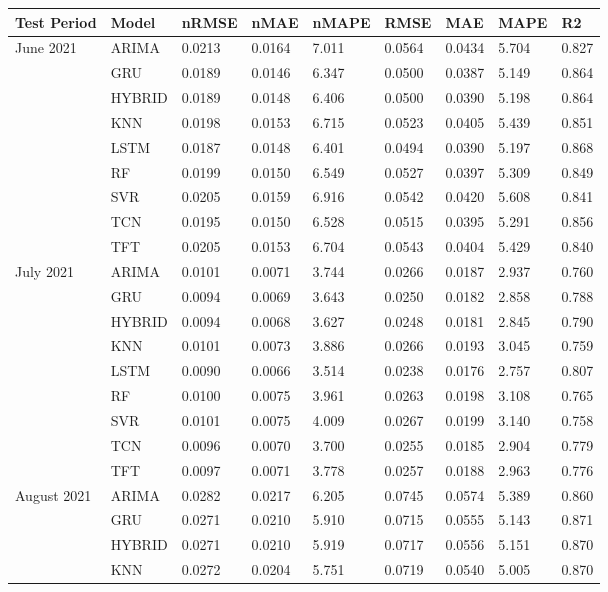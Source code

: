 \begin{tabular}{lllllllll}
\toprule
Test Period & Model & nRMSE & nMAE & nMAPE & RMSE & MAE & MAPE & R2 \\
\midrule
June 2021 & ARIMA & 0.0213 & 0.0164 & 7.011 & 0.0564 & 0.0434 & 5.704 & 0.827 \\
 & GRU & 0.0189 & 0.0146 & 6.347 & 0.0500 & 0.0387 & 5.149 & 0.864 \\
 & HYBRID & 0.0189 & 0.0148 & 6.406 & 0.0500 & 0.0390 & 5.198 & 0.864 \\
 & KNN & 0.0198 & 0.0153 & 6.715 & 0.0523 & 0.0405 & 5.439 & 0.851 \\
 & LSTM & 0.0187 & 0.0148 & 6.401 & 0.0494 & 0.0390 & 5.197 & 0.868 \\
 & RF & 0.0199 & 0.0150 & 6.549 & 0.0527 & 0.0397 & 5.309 & 0.849 \\
 & SVR & 0.0205 & 0.0159 & 6.916 & 0.0542 & 0.0420 & 5.608 & 0.841 \\
 & TCN & 0.0195 & 0.0150 & 6.528 & 0.0515 & 0.0395 & 5.291 & 0.856 \\
 & TFT & 0.0205 & 0.0153 & 6.704 & 0.0543 & 0.0404 & 5.429 & 0.840 \\
July 2021 & ARIMA & 0.0101 & 0.0071 & 3.744 & 0.0266 & 0.0187 & 2.937 & 0.760 \\
 & GRU & 0.0094 & 0.0069 & 3.643 & 0.0250 & 0.0182 & 2.858 & 0.788 \\
 & HYBRID & 0.0094 & 0.0068 & 3.627 & 0.0248 & 0.0181 & 2.845 & 0.790 \\
 & KNN & 0.0101 & 0.0073 & 3.886 & 0.0266 & 0.0193 & 3.045 & 0.759 \\
 & LSTM & 0.0090 & 0.0066 & 3.514 & 0.0238 & 0.0176 & 2.757 & 0.807 \\
 & RF & 0.0100 & 0.0075 & 3.961 & 0.0263 & 0.0198 & 3.108 & 0.765 \\
 & SVR & 0.0101 & 0.0075 & 4.009 & 0.0267 & 0.0199 & 3.140 & 0.758 \\
 & TCN & 0.0096 & 0.0070 & 3.700 & 0.0255 & 0.0185 & 2.904 & 0.779 \\
 & TFT & 0.0097 & 0.0071 & 3.778 & 0.0257 & 0.0188 & 2.963 & 0.776 \\
August 2021 & ARIMA & 0.0282 & 0.0217 & 6.205 & 0.0745 & 0.0574 & 5.389 & 0.860 \\
 & GRU & 0.0271 & 0.0210 & 5.910 & 0.0715 & 0.0555 & 5.143 & 0.871 \\
 & HYBRID & 0.0271 & 0.0210 & 5.919 & 0.0717 & 0.0556 & 5.151 & 0.870 \\
 & KNN & 0.0272 & 0.0204 & 5.751 & 0.0719 & 0.0540 & 5.005 & 0.870 \\

\end{tabular}
